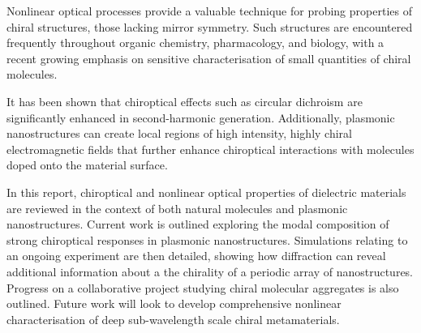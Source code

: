 \color{red}
Nonlinear optical processes provide a valuable technique for probing properties of chiral structures, those lacking mirror symmetry. 
Such structures are encountered frequently throughout organic chemistry, pharmacology, and biology, with a recent growing emphasis on sensitive characterisation of small quantities of chiral molecules. 
	    
It has been shown that chiroptical effects such as circular dichroism are significantly enhanced in second-harmonic generation. 
Additionally, plasmonic nanostructures can create local regions of high intensity, highly chiral electromagnetic fields that further enhance chiroptical interactions with molecules doped onto the material surface. 
	    
In this report, chiroptical and nonlinear optical properties of dielectric materials are reviewed in the context of both natural molecules and plasmonic nanostructures. 
Current work is outlined exploring the modal composition of strong chiroptical responses in plasmonic nanostructures. 
Simulations relating to an ongoing experiment are then detailed, showing how diffraction can reveal additional information about a the chirality of a periodic array of nanostructures. Progress on a collaborative project studying chiral molecular aggregates is also outlined. Future work will look to develop comprehensive nonlinear characterisation of deep sub-wavelength scale chiral metamaterials.
\color{black}